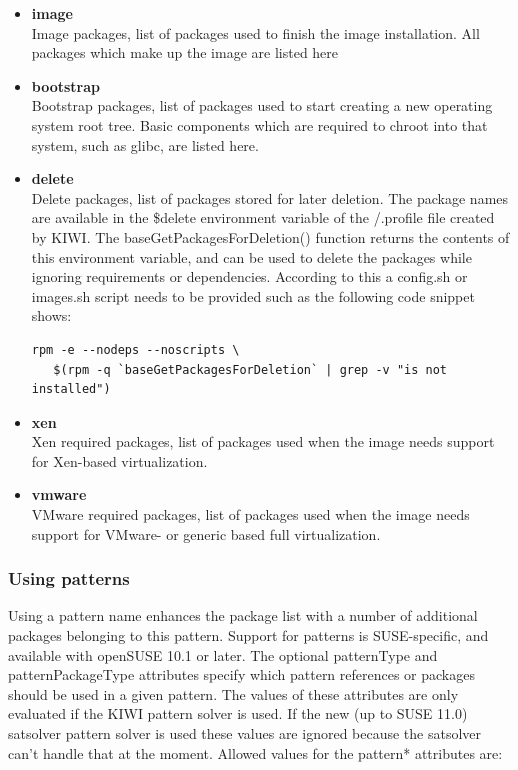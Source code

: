 \begin{itemize}
\item \textbf{image}\\
      Image packages, list of packages used to finish the image
      installation. All packages which make up the image are listed here
\item \textbf{bootstrap}\\
      Bootstrap packages, list of packages used to start creating a
      new operating system root tree. Basic components which are
      required to chroot into that system, such as glibc, are listed here.

\item \textbf{delete}\\
      Delete packages, list of packages stored for later deletion.
      The package names are available in the \$delete environment
      variable of the /.profile file created by KIWI. The 
      baseGetPackagesForDeletion() function returns the contents of this
      environment variable, and can be used to delete the packages
      while ignoring requirements or dependencies. According to this
      a config.sh or images.sh script needs to be provided such as
      the following code snippet shows:
\begin{verbatim}
rpm -e --nodeps --noscripts \
   $(rpm -q `baseGetPackagesForDeletion` | grep -v "is not installed")
\end{verbatim}
\item \textbf{xen}\\
      Xen required packages, list of packages used when the image
      needs support for Xen-based virtualization.
\item \textbf{vmware}\\
      VMware required packages, list of packages used when the image
      needs support for VMware- or generic based full virtualization.
\end{itemize}

\subsubsection{Using patterns}
Using a pattern name enhances the package list with a number of
additional packages belonging to this pattern. Support for patterns
is SUSE-specific, and available with openSUSE 10.1 or later.
The optional patternType and patternPackageType attributes specify
which pattern references or packages should be used in a given pattern.
The values of these attributes are only evaluated if the KIWI pattern
solver is used. If the new (up to SUSE 11.0) satsolver pattern solver
is used these values are ignored because the satsolver can't handle
that at the moment. Allowed values for the pattern* attributes are:

